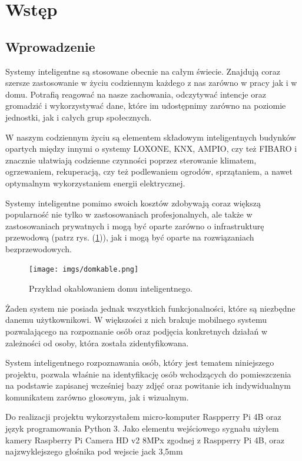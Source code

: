 \documentclass[a4paper,12pt,reqno]{article}
\begin{document}
%
%
\section{Wstęp} \label{section:wstep}

\subsection{Wprowadzenie}

Systemy inteligentne są stosowane obecnie na całym świecie. Znajdują coraz szersze zastosowanie w życiu codziennym każdego z nas zarówno w pracy jak i w domu. Potrafią reagować na nasze zachowania, odczytywać intencje oraz gromadzić i wykorzystywać dane, które im udostępnimy zarówno na poziomie jednostki, jak i całych grup społecznych.

W naszym codziennym życiu są elementem składowym inteligentnych budynków opartych między innymi o systemy LOXONE, KNX, AMPIO, czy też FIBARO i znacznie ułatwiają codzienne czynności poprzez sterowanie klimatem, ogrzewaniem, rekuperacją, czy też podlewaniem ogrodów, sprzątaniem, a nawet optymalnym wykorzystaniem energii elektrycznej.

Systemy inteligentne pomimo swoich kosztów zdobywają coraz większą popularność nie tylko w zastosowaniach profesjonalnych, ale także w zastosowaniach prywatnych i mogą być oparte zarówno o infrastrukturę przewodową (patrz rys. (\ref{kable})), jak i mogą być oparte na rozwiązaniach bezprzewodowych.

\begin{figure}[H]%
\centering
\texttt{[image: imgs/domkable.png]}
\caption{Przykład okablowaniem domu inteligentnego. \cite{img_by_me} \label{kable}}
\quad
\end{figure}

Żaden system nie posiada jednak wszystkich funkcjonalności, które są niezbędne danemu użytkownikowi. W większości z nich brakuje mobilnego systemu pozwalającego na rozpoznanie osób oraz podjęcia konkretnych działań w zależności od osoby, która została zidentyfikowana.

System inteligentnego rozpoznawania osób, który jest tematem niniejszego projektu, pozwala właśnie na identyfikację osób wchodzących do pomieszczenia na podstawie zapisanej wcześniej bazy zdjęć oraz powitanie ich indywidualnym komunikatem zarówno głosowym, jak i wizualnym.

Do realizacji projektu wykorzystałem micro-komputer Raspperry Pi 4B oraz język programowania Python 3. Jako elementu wejściowego sygnału użyłem kamery Raspberry Pi Camera HD v2 8MPx zgodnej z Raspperry Pi 4B, oraz najzwyklejszego głośnika pod wejscie jack 3,5mm
\end{document}

